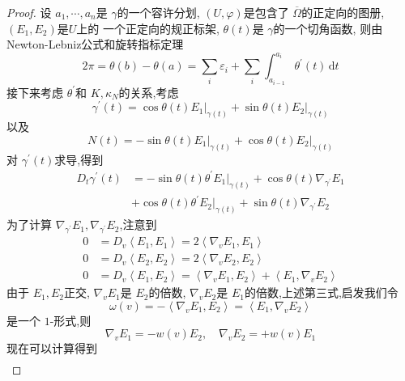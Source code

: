 \documentclass[../../main.tex]{subfiles}
\begin{document}
\begin{proof}
    设 \(  a_1,\cdots ,a_{n}  \)是 \(   \gamma   \)的一个容许分划, \(  \left( U, \varphi  \right)   \)是包含了 \(   \overline{ \Omega }\)的正定向的图册,  \(  \left( E_1,E_2 \right)   \)是\(  U  \)上的  一个正定向的规正标架,  \(   \theta \left( t \right)   \)是 \(   \gamma   \)的一个切角函数,  则由Newton-Lebniz公式和旋转指标定理  
    \[
    2\pi =  \theta \left( b \right)- \theta \left( a \right)=\sum _{i} \varepsilon _{i}+  \sum _{i}\int_{a_{i-1}}  ^{a_{i}} \theta ^{\prime} \left( t \right)\,\mathrm{d} t 
    \] 接下来考虑 \(   \theta ^{\prime}   \)和 \(  K, \kappa _{N}  \)的关系,考虑 \[
     \gamma ^{\prime} \left( t \right)=  \cos \theta \left( t \right)\left. E_1 \right|_{ \gamma \left( t \right) }  +\sin  \theta \left( t \right)\left. E_2 \right|_{ \gamma \left( t \right) } 
    \] 以及 \[
    N\left( t \right)= -\sin   \theta \left( t \right)\left. E_1 \right|_{ \gamma \left( t \right) }+   \cos  \theta \left( t \right) \left. E_2 \right|_{ \gamma \left( t \right) } 
    \]对 \(   \gamma ^{\prime} \left( t \right)   \)求导,得到 \[
  \begin{aligned}
    D_{t} \gamma ^{\prime} \left( t \right)&= -\sin  \theta \left( t \right) \theta ^{\prime} \left. E_1 \right|_{ \gamma \left( t \right) }+ \cos  \theta \left( t \right)  \nabla _{ \gamma ^{\prime} }E_1\\ 
     &+  \cos  \theta \left( t \right) \theta ^{\prime} \left. E_2 \right|_{ \gamma \left( t \right) }+ \sin  \theta \left( t \right) \nabla _{ \gamma ^{\prime} }E_2  
  \end{aligned}   
    \] 为了计算 \(   \nabla _{ \gamma ^{\prime} }E_1, \nabla _{ \gamma ^{\prime} }E_2  \),注意到 \[
    \begin{aligned}
    0&= D_{v}\left<E_1,E_1 \right>= 2\left< \nabla _{v}E_1,E_1 \right> \\ 
     0&= D_{v}\left<E_2,E_2 \right>= 2\left< \nabla _{v}E_2,E_2 \right>\\ 
      0&= D_{v}\left<E_1,E_2 \right>= \left< \nabla _{v}E_1,E_2 \right>+\left< E_1, \nabla _{v}E_2 \right>
    \end{aligned}
    \] 由于 \(  E_1,E_2  \)正交, \(   \nabla _{v}E_1  \)是 \(  E_2 \)的倍数, \(   \nabla _{v}E_2  \)是 \(  E_1  \)的倍数,上述第三式,启发我们令 \[
     \omega \left( v \right)=- \left< \nabla _{v}E_1,E_2 \right>= \left<E_1, \nabla _{v}E_2 \right> 
    \]  是一个 \(  1  \)-形式,则 \[
     \nabla _{v}E_1= -w\left( v \right)E_2 ,\quad  \nabla _{v}E_2= + w\left( v \right)E_1 
    \]  现在可以计算得到 \[
    \begin{aligned}

\end{aligned}\]
\end{proof}
\end{document}
